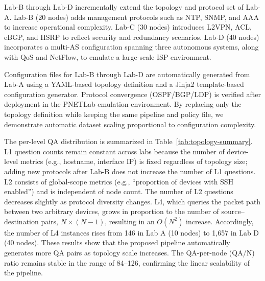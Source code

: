 Lab-B through Lab-D incrementally extend the topology and protocol set of Lab-A.
Lab-B (20 nodes) adds management protocols such as NTP, SNMP, and AAA to increase operational complexity.
Lab-C (30 nodes) introduces L2VPN, ACL, eBGP, and HSRP to reflect security and redundancy scenarios.
Lab-D (40 nodes) incorporates a multi-AS configuration spanning three autonomous systems, along with QoS and NetFlow, to emulate a large-scale ISP environment.




Configuration files for Lab-B through Lab-D are automatically generated from Lab-A using a YAML-based topology definition and a Jinja2 template-based configuration generator. Protocol convergence (OSPF/BGP/LDP) is verified after deployment in the PNETLab emulation environment.
By replacing only the topology definition while keeping the same pipeline and policy file, we demonstrate automatic dataset scaling proportional to configuration complexity.

The per-level QA distribution is summarized in Table~\ref{tab:topology-summary}.
L1 question counts remain constant across labs because the number of device-level metrics (e.g., hostname, interface IP) is fixed regardless of topology size; adding new protocols after Lab-B does not increase the number of L1 questions.
L2 consists of global-scope metrics (e.g., ``proportion of devices with SSH enabled'') and is independent of node count. The number of L2 questions decreases slightly as protocol diversity changes.
L4, which queries the packet path between two arbitrary devices, grows in proportion to the number of source–destination pairs, $N \times (N-1)$, resulting in an $O(N^2)$ increase. Accordingly, the number of L4 instances rises from 146 in Lab A (10 nodes) to 1,657 in Lab D (40 nodes).
These results show that the proposed pipeline automatically generates more QA pairs as topology scale increases.
The QA-per-node (QA/N) ratio remains stable in the range of 84--126, confirming the linear scalability of the pipeline.


